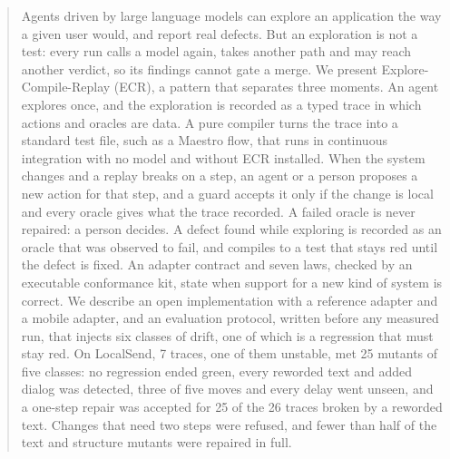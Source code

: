 \begin{abstract}
Agents driven by large language models can explore an application the way a given user would, and report real defects. But an exploration is not a test: every run calls a model again, takes another path and may reach another verdict, so its findings cannot gate a merge. We present Explore-Compile-Replay (ECR), a pattern that separates three moments. An agent explores once, and the exploration is recorded as a typed trace in which actions and oracles are data. A pure compiler turns the trace into a standard test file, such as a Maestro flow, that runs in continuous integration with no model and without ECR installed. When the system changes and a replay breaks on a step, an agent or a person proposes a new action for that step, and a guard accepts it only if the change is local and every oracle gives what the trace recorded. A failed oracle is never repaired: a person decides. A defect found while exploring is recorded as an oracle that was observed to fail, and compiles to a test that stays red until the defect is fixed. An adapter contract and seven laws, checked by an executable conformance kit, state when support for a new kind of system is correct. We describe an open implementation with a reference adapter and a mobile adapter, and an evaluation protocol, written before any measured run, that injects six classes of drift, one of which is a regression that must stay red. On LocalSend, 7 traces, one of them unstable, met 25 mutants of five classes: no regression ended green, every reworded text and added dialog was detected, three of five moves and every delay went unseen, and a one-step repair was accepted for 25 of the 26 traces broken by a reworded text. Changes that need two steps were refused, and fewer than half of the text and structure mutants were repaired in full.
\end{abstract}
